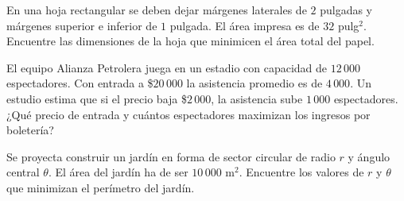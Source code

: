 \begin{prob}
En una hoja rectangular se deben dejar márgenes laterales de $2$
pulgadas y márgenes superior e inferior de $1$ pulgada. El área
impresa es de $32$ pulg$^2$. Encuentre las dimensiones de la hoja
que minimicen el área total del papel.
\end{prob}

\begin{prob}
El equipo Alianza Petrolera juega en un estadio con capacidad de
$12\,000$ espectadores. Con entrada a \$$20\,000$ la asistencia
promedio es de $4\,000$. Un estudio estima que si el precio baja
\$$2\,000$, la asistencia sube $1\,000$ espectadores. ¿Qué precio de
entrada y cuántos espectadores maximizan los ingresos por boletería?
\end{prob}

\begin{prob}
Se proyecta construir un jardín en forma de sector circular de radio
$r$ y ángulo central $\theta$. El área del jardín ha de ser
$10\,000$ m$^2$. Encuentre los valores de $r$ y $\theta$ que
minimizan el perímetro del jardín.
\end{prob}

